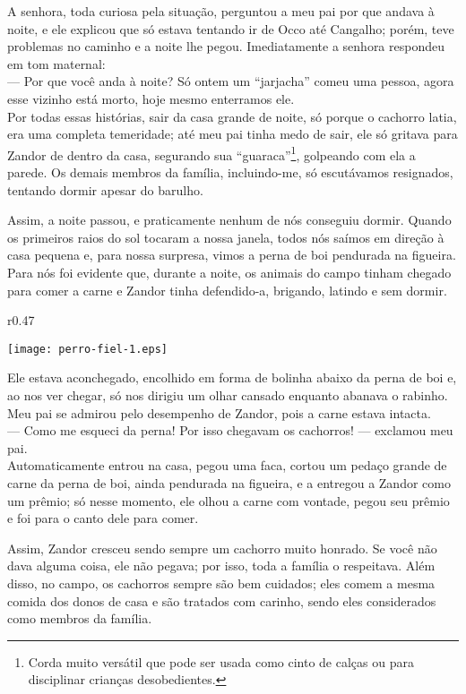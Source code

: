 A senhora, toda curiosa pela situação, perguntou a meu pai por que andava à noite, e ele explicou que só estava tentando ir de Occo até Cangalho; porém, teve problemas no caminho e a noite lhe pegou. 
Imediatamente a senhora respondeu em tom maternal:\\\indent 
--- Por que você anda à noite? Só ontem um ``jarjacha'' comeu uma pessoa, agora esse vizinho está morto, hoje mesmo enterramos ele.\\\indent
Por todas essas histórias, sair da casa grande de noite, só porque o cachorro latia, era uma completa temeridade; até meu pai tinha medo de sair, ele só gritava para Zandor de dentro da casa, segurando sua ``guaraca''\footnote{Corda muito versátil que pode ser usada como cinto de calças ou para disciplinar crianças desobedientes.}, golpeando com ela a parede. 
Os demais membros da família, incluindo-me, só escutávamos resignados, tentando dormir apesar do barulho.

Assim, a noite passou, e praticamente nenhum de nós conseguiu dormir. 
Quando os primeiros raios do sol tocaram a nossa janela, todos nós saímos em direção à casa pequena e, para nossa surpresa, vimos a perna de boi pendurada na figueira. 
Para nós foi evidente que, durante a noite, os animais do campo tinham chegado para comer a carne e Zandor tinha defendido-a, brigando, latindo e sem dormir.
\ifdefined\EnableIncludeImages 
\begin{wrapfigure}{r}{0.47\textwidth}
  \begin{center}
  \vspace{-0.5cm}
    \texttt{[image: perro-fiel-1.eps]}
  \end{center}
  \vspace{-0.5cm}
\end{wrapfigure}
\fi
Ele estava aconchegado, encolhido em forma de bolinha abaixo da perna de boi e, ao nos ver chegar, só nos dirigiu um olhar cansado enquanto abanava o rabinho. Meu pai se admirou pelo desempenho de Zandor, pois a carne estava intacta.\\\indent
--- Como me esqueci da perna! Por isso chegavam os cachorros! --- exclamou meu pai.\\\indent
Automaticamente entrou na casa, pegou uma faca, cortou um pedaço grande de carne da perna de boi, ainda pendurada na figueira, e a entregou a Zandor como um prêmio; só nesse momento, ele olhou a carne com vontade, pegou seu prêmio e foi para o canto dele para comer.

Assim, Zandor cresceu sendo sempre um cachorro muito honrado. Se você não dava alguma coisa, ele não pegava; por isso, toda a família o respeitava. Além disso, no campo, os cachorros sempre são bem cuidados; eles comem a mesma comida dos donos de casa e são tratados com carinho, sendo eles considerados como membros da família.

